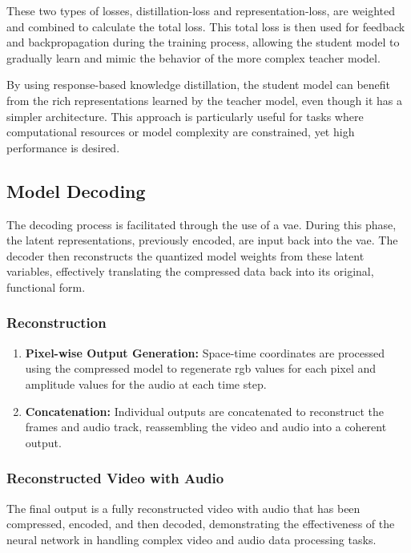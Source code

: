 \documentclass{ioereport}
\begin{document}
    These two types of losses, distillation-loss and representation-loss, are weighted and combined to calculate the total loss. This total loss is then used for feedback and backpropagation during the training process, allowing the student model to gradually learn and mimic the behavior of the more complex teacher model.
    
    By using response-based knowledge distillation, the student model can benefit from the rich representations learned by the teacher model, even though it has a simpler architecture. This approach is particularly useful for tasks where computational resources or model complexity are constrained, yet high performance is desired.

    \subsection{Model Decoding}
        The decoding process is facilitated through the use of a \gls{vae}. During this phase, the latent representations, previously encoded, are input back into the \gls{vae}. The decoder then reconstructs the quantized model weights from these latent variables, effectively translating the compressed data back into its original, functional form.
        \subsubsection{Reconstruction}
        \begin{enumerate}[label=\textbf{\roman*.}]
          \item \textbf{Pixel-wise Output Generation:} Space-time coordinates are processed using the compressed model to regenerate \gls{rgb} values for each pixel and amplitude values for the audio at each time step.
          \item \textbf{Concatenation:} Individual outputs are concatenated to reconstruct the frames and audio track, reassembling the video and audio into a coherent output.
        \end{enumerate}
        
        \subsubsection{Reconstructed Video with Audio}
        The final output is a fully reconstructed video with audio that has been compressed, encoded, and then decoded, demonstrating the effectiveness of the neural network in handling complex video and audio data processing tasks.
\end{document}
